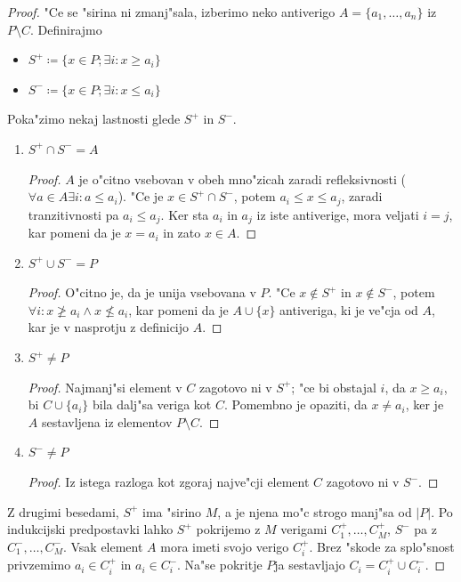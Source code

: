 \documentclass[a4paper,12pt]{article}
\theoremstyle{definition}
\theoremstyle{remark}
\begin{document}
\begin{proof}
	"Ce se "sirina ni zmanj"sala, izberimo neko antiverigo $A=\{a_1, \ldots, a_n\}$ iz $P \setminus C$. Definirajmo
	\begin{itemize}
		\item $S^+ \coloneqq \{x \in P; \exists i: x \geqslant a_i\}$
		\item $S^- \coloneqq \{x \in P; \exists i: x \leqslant a_i\}$
	\end{itemize}
	Poka"zimo nekaj lastnosti glede $S^+$ in $S^-$.
	\begin{enumerate}
		\item $S^+ \cap S^- = A$
		\begin{proof}
			$A$ je o"citno vsebovan v obeh mno"zicah zaradi refleksivnosti ($\forall a \in A \exists i: a \leqslant a_i$). "Ce je $x \in S^+ \cap S^-$, potem $a_i \leqslant x \leqslant a_j$, zaradi tranzitivnosti pa $a_i \leqslant a_j$. Ker sta $a_i$ in $a_j$ iz iste antiverige, mora veljati $i=j$, kar pomeni da je $x = a_i$ in zato $x \in A$.
		\end{proof}
		\item $S^+ \cup S^- = P$
		\begin{proof}
			O"citno je, da je unija vsebovana v $P$. "Ce $x \notin S^+$ in $x \notin S^-$, potem $\forall i: x \not\geqslant a_i \land x \not\leqslant a_i$, kar pomeni da je $A \cup \{x\}$ antiveriga, ki je ve"cja od $A$, kar je v nasprotju z definicijo $A$.
		\end{proof}
		\item $S^+ \neq P$
		\begin{proof}
			Najmanj"si element v $C$ zagotovo ni v $S^+$; "ce bi obstajal $i$, da $x \geqslant a_i$, bi $C \cup \{a_i\}$ bila dalj"sa veriga kot $C$. Pomembno je opaziti, da $x \neq a_i$, ker je $A$ sestavljena iz elementov $P \setminus C$.
		\end{proof}
		\item $S^- \neq P$
		\begin{proof}
			Iz istega razloga kot zgoraj najve"cji element $C$ zagotovo ni v $S^-$.
		\end{proof}
	\end{enumerate}
	Z drugimi besedami, $S^+$ ima "sirino $M$, a je njena mo"c strogo manj"sa od $|P|$. Po indukcijski predpostavki lahko $S^+$ pokrijemo z $M$ verigami $C_1^+, \ldots, C_M^+$, $S^-$ pa z $C_1^-, \ldots, C_M^-$. Vsak element $A$ mora imeti svojo verigo $C_i^+$. Brez "skode za splo"snost privzemimo $a_i \in C_i^+$ in $a_i \in C_i^-$. Na"se pokritje $P$ja sestavljajo $C_i = C_i^+ \cup C_i^-$.
\end{proof}
\end{document}
